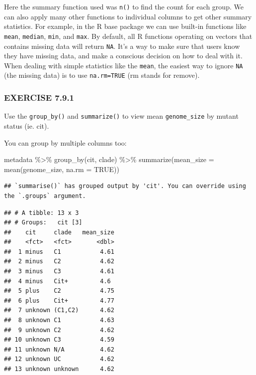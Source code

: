 \documentclass[
]{book}
\newenvironment{Shaded}{\begin{snugshade}}{\end{snugshade}}
\newcommand{\AttributeTok}[1]{\textcolor[rgb]{0.77,0.63,0.00}{#1}}
\newcommand{\ConstantTok}[1]{\textcolor[rgb]{0.00,0.00,0.00}{#1}}
\newcommand{\FunctionTok}[1]{\textcolor[rgb]{0.00,0.00,0.00}{#1}}
\newcommand{\NormalTok}[1]{#1}
\newcommand{\SpecialCharTok}[1]{\textcolor[rgb]{0.00,0.00,0.00}{#1}}
\begin{document}
Here the summary function used was \texttt{n()} to find the count for each group. We can also apply many other functions to individual columns to get other summary statistics. For example, in the R base package we can use built-in functions like \texttt{mean}, \texttt{median}, \texttt{min}, and \texttt{max}. By default, all R functions operating on vectors that contains missing data will return \texttt{NA}. It's a way to make sure that users know they have missing data, and make a conscious decision on how to deal with it. When dealing with simple statistics like the \texttt{mean}, the easiest way to ignore \texttt{NA} (the missing data) is to use \texttt{na.rm=TRUE} (rm stands for remove).

\hypertarget{exercise-7.9.1}{%
\subsubsection*{EXERCISE 7.9.1}\label{exercise-7.9.1}}

Use the \texttt{group\_by()} and \texttt{summarize()} to view mean \texttt{genome\_size} by mutant status (ie. cit).

You can group by multiple columns too:

\begin{Shaded}
\begin{Highlighting}[]
\NormalTok{metadata }\SpecialCharTok{\%\textgreater{}\%}
  \FunctionTok{group\_by}\NormalTok{(cit, clade) }\SpecialCharTok{\%\textgreater{}\%}
  \FunctionTok{summarize}\NormalTok{(}\AttributeTok{mean\_size =} \FunctionTok{mean}\NormalTok{(genome\_size, }\AttributeTok{na.rm =} \ConstantTok{TRUE}\NormalTok{))}
\end{Highlighting}
\end{Shaded}

\begin{verbatim}
## `summarise()` has grouped output by 'cit'. You can override using the `.groups` argument.
\end{verbatim}

\begin{verbatim}
## # A tibble: 13 x 3
## # Groups:   cit [3]
##    cit     clade   mean_size
##    <fct>   <fct>       <dbl>
##  1 minus   C1           4.61
##  2 minus   C2           4.62
##  3 minus   C3           4.61
##  4 minus   Cit+         4.6 
##  5 plus    C2           4.75
##  6 plus    Cit+         4.77
##  7 unknown (C1,C2)      4.62
##  8 unknown C1           4.63
##  9 unknown C2           4.62
## 10 unknown C3           4.59
## 11 unknown N/A          4.62
## 12 unknown UC           4.62
## 13 unknown unknown      4.62
\end{verbatim}
\end{document}
